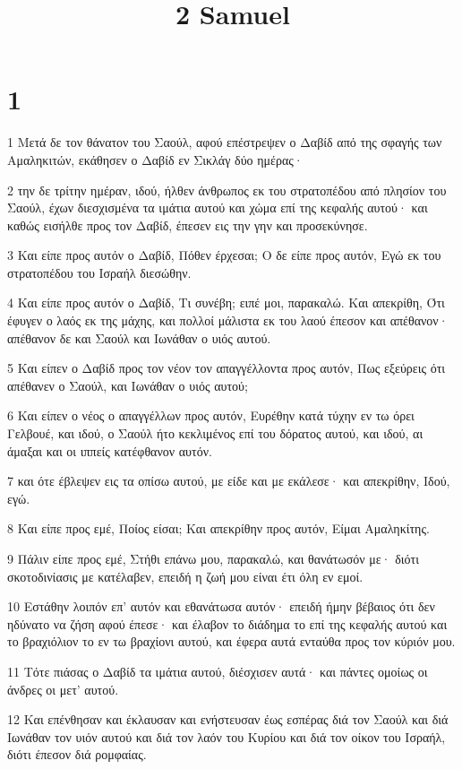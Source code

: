 

\title{2 Samuel}


\chapter{1}

\par 1 Μετά δε τον θάνατον του Σαούλ, αφού επέστρεψεν ο Δαβίδ από της σφαγής των Αμαληκιτών, εκάθησεν ο Δαβίδ εν Σικλάγ δύο ημέρας·
\par 2 την δε τρίτην ημέραν, ιδού, ήλθεν άνθρωπος εκ του στρατοπέδου από πλησίον του Σαούλ, έχων διεσχισμένα τα ιμάτια αυτού και χώμα επί της κεφαλής αυτού· και καθώς εισήλθε προς τον Δαβίδ, έπεσεν εις την γην και προσεκύνησε.
\par 3 Και είπε προς αυτόν ο Δαβίδ, Πόθεν έρχεσαι; Ο δε είπε προς αυτόν, Εγώ εκ του στρατοπέδου του Ισραήλ διεσώθην.
\par 4 Και είπε προς αυτόν ο Δαβίδ, Τι συνέβη; ειπέ μοι, παρακαλώ. Και απεκρίθη, Ότι έφυγεν ο λαός εκ της μάχης, και πολλοί μάλιστα εκ του λαού έπεσον και απέθανον· απέθανον δε και Σαούλ και Ιωνάθαν ο υιός αυτού.
\par 5 Και είπεν ο Δαβίδ προς τον νέον τον απαγγέλλοντα προς αυτόν, Πως εξεύρεις ότι απέθανεν ο Σαούλ, και Ιωνάθαν ο υιός αυτού;
\par 6 Και είπεν ο νέος ο απαγγέλλων προς αυτόν, Ευρέθην κατά τύχην εν τω όρει Γελβουέ, και ιδού, ο Σαούλ ήτο κεκλιμένος επί του δόρατος αυτού, και ιδού, αι άμαξαι και οι ιππείς κατέφθανον αυτόν.
\par 7 και ότε έβλεψεν εις τα οπίσω αυτού, με είδε και με εκάλεσε· και απεκρίθην, Ιδού, εγώ.
\par 8 Και είπε προς εμέ, Ποίος είσαι; Και απεκρίθην προς αυτόν, Είμαι Αμαληκίτης.
\par 9 Πάλιν είπε προς εμέ, Στήθι επάνω μου, παρακαλώ, και θανάτωσόν με· διότι σκοτοδινίασις με κατέλαβεν, επειδή η ζωή μου είναι έτι όλη εν εμοί.
\par 10 Εστάθην λοιπόν επ' αυτόν και εθανάτωσα αυτόν· επειδή ήμην βέβαιος ότι δεν ηδύνατο να ζήση αφού έπεσε· και έλαβον το διάδημα το επί της κεφαλής αυτού και το βραχιόλιον το εν τω βραχίονι αυτού, και έφερα αυτά ενταύθα προς τον κύριόν μου.
\par 11 Τότε πιάσας ο Δαβίδ τα ιμάτια αυτού, διέσχισεν αυτά· και πάντες ομοίως οι άνδρες οι μετ' αυτού.
\par 12 Και επένθησαν και έκλαυσαν και ενήστευσαν έως εσπέρας διά τον Σαούλ και διά Ιωνάθαν τον υιόν αυτού και διά τον λαόν του Κυρίου και διά τον οίκον του Ισραήλ, διότι έπεσον διά ρομφαίας.
